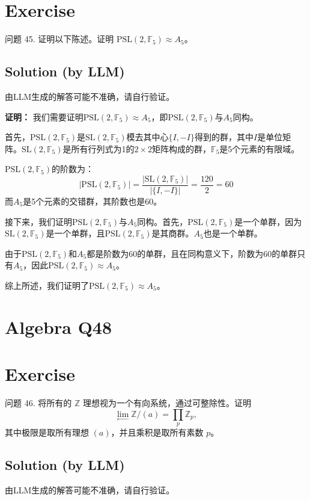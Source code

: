 \documentclass[12pt]{book}
\begin{document}
\section*{Exercise}
问题 45. 证明以下陈述。证明 $\text{PSL}(2, \mathbb{F}_5) \approx A_5$。





\subsection*{Solution (by LLM)}
由LLM生成的解答可能不准确，请自行验证。

\textbf{证明：} 我们需要证明$\text{PSL}(2, \mathbb{F}_5) \approx A_5$，即$\text{PSL}(2, \mathbb{F}_5)$与$A_5$同构。

首先，$\text{PSL}(2, \mathbb{F}_5)$是$\text{SL}(2, \mathbb{F}_5)$模去其中心$\{I, -I\}$得到的群，其中$I$是单位矩阵。$\text{SL}(2, \mathbb{F}_5)$是所有行列式为1的$2 \times 2$矩阵构成的群，$\mathbb{F}_5$是5个元素的有限域。

$\text{PSL}(2, \mathbb{F}_5)$的阶数为：
\[
|\text{PSL}(2, \mathbb{F}_5)| = \frac{|\text{SL}(2, \mathbb{F}_5)|}{|\{I, -I\}|} = \frac{120}{2} = 60
\]
而$A_5$是5个元素的交错群，其阶数也是60。

接下来，我们证明$\text{PSL}(2, \mathbb{F}_5)$与$A_5$同构。首先，$\text{PSL}(2, \mathbb{F}_5)$是一个单群，因为$\text{SL}(2, \mathbb{F}_5)$是一个单群，且$\text{PSL}(2, \mathbb{F}_5)$是其商群。$A_5$也是一个单群。

由于$\text{PSL}(2, \mathbb{F}_5)$和$A_5$都是阶数为60的单群，且在同构意义下，阶数为60的单群只有$A_5$，因此$\text{PSL}(2, \mathbb{F}_5) \approx A_5$。

综上所述，我们证明了$\text{PSL}(2, \mathbb{F}_5) \approx A_5$。
\newpage
\section{Algebra Q48}
\section*{Exercise}
问题 46. 将所有的 $\mathbb{Z}$ 理想视为一个有向系统，通过可整除性。证明 $$\lim_{\leftarrow} \mathbb{Z}/(a) = \prod_{p} \mathbb{Z}_{p},$$ 其中极限是取所有理想 $(a)$，并且乘积是取所有素数 $p$。





\subsection*{Solution (by LLM)}
由LLM生成的解答可能不准确，请自行验证。
\end{document}
